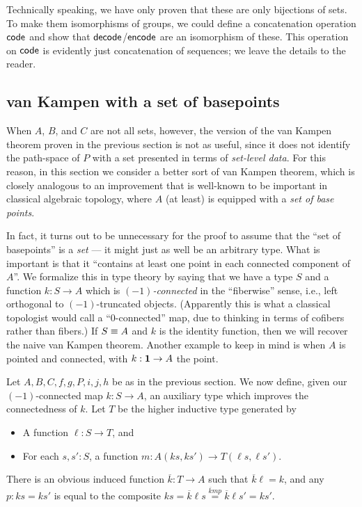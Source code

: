 Technically speaking, we have only proven that these are only bijections of sets.
To make them isomorphisms of groups, we could define a concatenation operation $\mathsf{code}$ and show that $\mathsf{decode}$/$\mathsf{encode}$ are an isomorphism of these.
This operation on $\mathsf{code}$ is evidently just concatenation of sequences; we leave the details to the reader.


\subsection{van Kampen with a set of basepoints}
\label{sec:better-vankampen}

When $A$, $B$, and $C$ are not all sets, however, the version of the van Kampen theorem proven in the previous section is not as useful, since it does not identify the path-space of $P$ with a set presented in terms of \emph{set-level data}.
For this reason, in this section we consider a better sort of van Kampen theorem, which is closely analogous to an improvement that is well-known to be important in classical algebraic topology, where $A$ (at least) is equipped with a \emph{set of base points}.

In fact, it turns out to be unnecessary for the proof to assume that the ``set of basepoints'' is a \emph{set} --- it might just as well be an arbitrary type.
What is important is that it ``contains at least one point in each connected component of $A$''.
We formalize this in type theory by saying that we have a type $S$ and a function $k:S \to A$ which is \emph{$(-1)$-connected} in the ``fiberwise'' sense, i.e., left orthogonal to $(-1)$-truncated objects.
(Apparently this is what a classical topologist would call a ``$0$-connected'' map, due to thinking in terms of cofibers rather than fibers.)
If $S\equiv A$ and $k$ is the identity function, then we will recover the naive van Kampen theorem.
Another example to keep in mind is when $A$ is pointed and connected, with $k:\mathbf{1}\to A$ the point.

Let $A,B,C,f,g,P,i,j,h$ be as in the previous section.
We now define, given our $(-1)$-connected map $k:S\to A$, an auxiliary type which improves the connectedness of $k$.
Let $T$ be the higher inductive type generated by
\begin{itemize}
\item A function $\ell:S\to T$, and
\item For each $s,s':S$, a function $m:A(ks,ks') \to T(\ell s, \ell s')$.
\end{itemize}
\newcommand{\kbar}{\overline{k}}
There is an obvious induced function $\kbar:T\to A$ such that $\kbar \ell = k$, and any $p:ks=ks'$ is equal to the composite $ks = \kbar \ell s \overset{\kbar m p}{=} \kbar \ell s' = k s'$.

